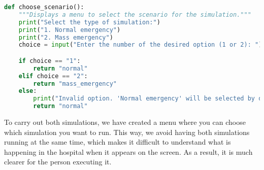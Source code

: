 \documentclass[a4paper,12pt]{article}
\begin{document}
\begin{lstlisting}[language=Python]
def choose_scenario():
    """Displays a menu to select the scenario for the simulation."""
    print("Select the type of simulation:")
    print("1. Normal emergency")
    print("2. Mass emergency")
    choice = input("Enter the number of the desired option (1 or 2): ")

    if choice == "1":
        return "normal"
    elif choice == "2":
        return "mass_emergency"
    else:
        print("Invalid option. 'Normal emergency' will be selected by default.")
        return "normal"

\end{lstlisting}
To carry out both simulations, we have created a menu where you can choose which simulation you want to run. This way, we avoid having both simulations running at the same time, which makes it difficult to understand what is happening in the hospital when it appears on the screen. As a result, it is much clearer for the person executing it.
\end{document}
